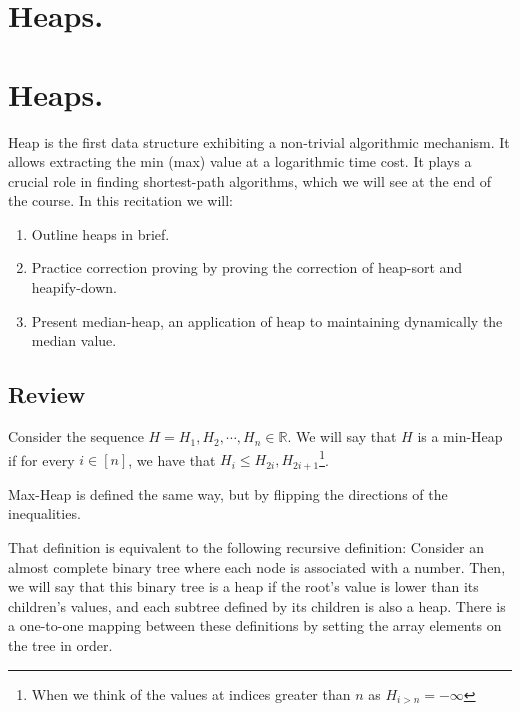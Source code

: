 


\ifdefined\BOOK
  \chapter{Heaps.} 
\else
\setcounter{chapter}{5}
\chapter*{Heaps.} 
\thispagestyle{firststyle}
\fi


Heap is the first data structure exhibiting a non-trivial algorithmic mechanism. It allows extracting the min (max) value at a logarithmic time cost. It plays a crucial role in finding shortest-path algorithms, which we will see at the end of the course. In this recitation we will: 
\begin{enumerate}
  \item Outline heaps in brief. 
  \item Practice correction proving by proving the correction of heap-sort and heapify-down. 
  \item Present median-heap, an application of heap to maintaining dynamically the median value.
\end{enumerate}

\section{Review}
  \begin{definition}    
    Consider the sequence $H = H_{1}, H_{2}, \cdots, H_{n} \in \mathbb{R}$. We will say that $H$ is a min-Heap if for every $i \in [n]$, we have that $H_{i} \le H_{2i}, H_{2i + 1}$\footnote{When we think of the values at indices greater than $n$ as $H_{i>n} = -\infty$}.


Max-Heap is defined the same way, but by flipping the directions of the inequalities.
  \end{definition}

That definition is equivalent to the following recursive definition: Consider an almost complete binary tree where each node is associated with a number. Then, we will say that this binary tree is a heap if the root's value is lower than its children's values, and each subtree defined by its children is also a heap. There is a one-to-one mapping between these definitions by setting the array elements on the tree in order.


